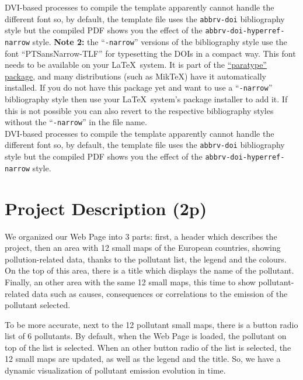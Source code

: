 \documentclass[preprint,journal]{vgtc}       %
\begin{document}
\begin{itemize}
DVI-based processes to compile the template apparently cannot handle the different font so, by default, the template file uses the \texttt{abbrv-doi} bibliography style but the compiled PDF shows you the effect of the \texttt{abbrv-doi-hyperref-narrow} style.
\textbf{Note 2:} the ``\texttt{-narrow}'' versions of the bibliography style use the font ``PTSansNarrow-TLF'' for typesetting the DOIs in a compact way. This font needs to be available on your \LaTeX\ system. It is part of the \href{https://www.ctan.org/pkg/paratype}{``paratype'' package}, and many distributions (such as MikTeX) have it automatically installed. If you do not have this package yet and want to use a ``\texttt{-narrow}'' bibliography style then use your \LaTeX\ system's package installer to add it. If this is not possible you can also revert to the respective bibliography styles without the ``\texttt{-narrow}'' in the file name.\\[1em]
DVI-based processes to compile the template apparently cannot handle the different font so, by default, the template file uses the \texttt{abbrv-doi} bibliography style but the compiled PDF shows you the effect of the \texttt{abbrv-doi-hyperref-narrow} style.
\end{itemize}


\newpage



\section{Project Description (2p)}
We organized our Web Page into 3 parts:  first, a header which describes the project, then an area with 12 small maps of the European countries, showing pollution-related data, thanks to the pollutant list, the legend and the colours. On the top of this area, there is a title which displays the name of the pollutant. Finally, an other area with the same 12 small maps, this time to show pollutant-related data such as causes, consequences or correlations to the emission of the pollutant selected.

To be more accurate, next to the 12 pollutant small maps, there is a button radio list of 6 pollutants. By default, when the Web Page is loaded, the pollutant on top of the list is selected. When an other button radio of the list is selected, the 12 small maps are updated, as well as the legend and the title. So, we have a dynamic visualization of pollutant emission evolution in time.
\end{document}
